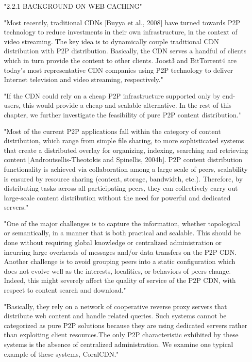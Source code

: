"2.2.1 BACKGROUND ON WEB CACHING"\cite{book:p2p-mob} %

"Most recently, traditional CDNs [Buyya et al., 2008] have turned towards P2P technology to reduce investments in their own infrastructure, in the context of video streaming.
The key idea is to dynamically couple traditional CDN distribution with P2P distribution.
Basically, the CDN serves a handful of clients which in turn provide the content to other clients.
Joost3 and BitTorrent4 are today’s most representative CDN companies using P2P technology to deliver Internet television
and video streaming, respectively."\cite{book:p2p-mob}

"If the CDN could rely on a cheap P2P infrastructure supported only by end-users, this would provide a cheap
and scalable alternative.
In the rest of this chapter, we further investigate the feasibility of pure P2P content distribution."\cite{book:p2p-mob}

"Most of the current P2P applications fall within the category of content distribution, which range from simple file sharing, to more sophisticated systems that create a distributed overlay for organizing, indexing, searching and retrieving content [Androutsellis-Theotokis and Spinellis, 2004b].
P2P content distribution functionality is achieved via collaboration among a large scale of peers, scalability is ensured by resource sharing (content, storage, bandwidth, etc.).
Therefore, by distributing tasks across all participating peers, they can collectively carry out large-scale content distribution without the need for powerful and dedicated servers."\cite{book:p2p-mob}

"One of the major challenges is to capture the information, whether topological or semantically, in a manner that is both practical and scalable.
This should be done without requiring global knowledge or centralized administration or incurring large overheads of messages and/or data transfers on the P2P CDN.
Another challenge is to avoid grouping peers into a static configuration which does not evolve well as the interests, localities, or behaviors of peers change.
Indeed, this might severely affect the quality of service of the P2P CDN, with respect to content search and download."\cite{book:p2p-mob}

"Basically, they rely on a network of cooperative reverse proxy servers that distribute web content and handle related queries.
Such systems cannot be categorized as pure P2P solutions because they are using dedicated servers rather than exploiting client resources.The only P2P characteristic exhibited by these systems is the absence of centralized administration.
We examine one typical example of these systems, CoralCDN."\cite{book:p2p-mob}

